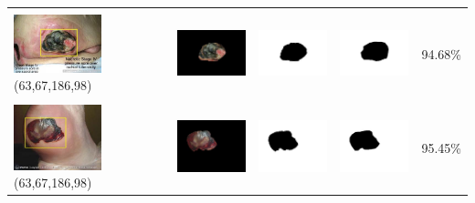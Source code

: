 \begin{table}[H]
\begin{tabular}{|m{1.0in}|m{1.0in}|m{1.0in}|m{1.0in}|m{0.6in}|}
		&  &  & \\
		\includegraphics[width=1.0in]{gambar/hasil_segmentasi/luka_hitam/image_33_rect.jpg} {\centering\fontsize{10}{10}\selectfont(63,67,186,98)}&
		\includegraphics[width=1.0in]{gambar/hasil_segmentasi/luka_hitam/result_33.jpg}&
		\includegraphics[width=1.0in]{gambar/hasil_segmentasi/luka_hitam/mask_r_33.jpg}&
		\includegraphics[width=1.0in]{gambar/hasil_segmentasi/luka_hitam/33_r.jpg}&
		94.68\% \\
		\hline 

		&  &  & \\
		\includegraphics[width=1.0in]{gambar/hasil_segmentasi/luka_hitam/image_37_rect.jpg} {\centering\fontsize{10}{10}\selectfont(63,67,186,98)}&
		\includegraphics[width=1.0in]{gambar/hasil_segmentasi/luka_hitam/result_37.jpg}&
		\includegraphics[width=1.0in]{gambar/hasil_segmentasi/luka_hitam/mask_r_37.jpg}&
		\includegraphics[width=1.0in]{gambar/hasil_segmentasi/luka_hitam/37_r.jpg}&
		95.45\% \\
		\hline 


\end{tabular}
\end{table}
